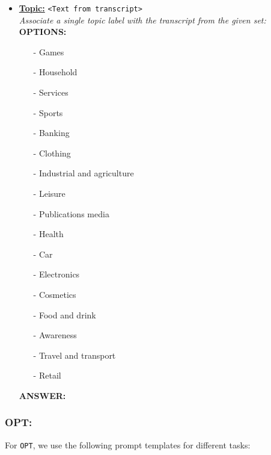 \begin{itemize}
\item \textbf{\underline{Topic:}}
\texttt{<Text from transcript>} \\
\textit{Associate a single topic label with the transcript from the given set:} \\
\textbf{OPTIONS:}
\begin{itemize}
\item [-] Games
\item [-] Household
\item [-] Services
\item [-] Sports 
\item [-] Banking 
\item [-] Clothing 
\item [-] Industrial and agriculture 
\item [-] Leisure 
\item [-] Publications media 
\item [-] Health 
\item [-] Car 
\item [-] Electronics 
\item [-] Cosmetics 
\item [-] Food and drink 
\item [-] Awareness 
\item [-] Travel and transport 
\item [-] Retail 
\end{itemize}
\textbf{ANSWER:}
\end{itemize}

\subsubsection{OPT:} For \texttt{OPT}, we use the following prompt templates for different tasks:

